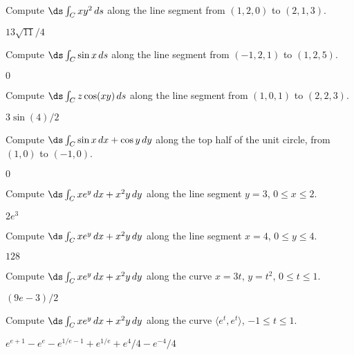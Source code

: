 \begin{exercises}

\begin{exercise} Compute $\ds\int_C xy^2\,ds$ along the line segment from
$(1,2,0)$ to $(2,1,3)$.
\begin{answer} $13\sqrt{11}/4$
\end{answer}\end{exercise}

\begin{exercise} Compute $\ds\int_C \sin x\,ds$ along the line segment from
$(-1,2,1)$ to $(1,2,5)$.
\begin{answer} $0$
\end{answer}\end{exercise}

\begin{exercise} Compute $\ds\int_C z\cos(xy)\,ds$ along the line segment from
$(1,0,1)$ to $(2,2,3)$.
\begin{answer} $3\sin(4)/2$
\end{answer}\end{exercise}

\begin{exercise} Compute $\ds\int_C \sin x\,dx+\cos y\,dy$ along the top half
of the unit circle, from $(1,0)$ to $(-1,0)$.
\begin{answer} $0$
\end{answer}\end{exercise}

\begin{exercise} Compute $\ds\int_C xe^y\,dx+x^2y\,dy$ along the line segment
$y=3$, $0\le x\le 2$.
\begin{answer} $2e^3$
\end{answer}\end{exercise}

\begin{exercise} Compute $\ds\int_C xe^y\,dx+x^2y\,dy$ along the line segment
$x=4$, $0\le y\le 4$.
\begin{answer} $128$
\end{answer}\end{exercise}

\begin{exercise} Compute $\ds\int_C xe^y\,dx+x^2y\,dy$ along the curve
$x=3t$, $y=t^2$, $0\le t\le1$.
\begin{answer} $(9e-3)/2$
\end{answer}\end{exercise}

\begin{exercise} Compute $\ds\int_C xe^y\,dx+x^2y\,dy$ along the 
curve $\langle e^t,e^t\rangle$, $-1\le t\le1$.
\begin{answer} $e^{e+1}-e^e-e^{1/e-1}+e^{1/e}+e^4/4-e^{-4}/4$
\end{answer}\end{exercise}


\end{exercises}
